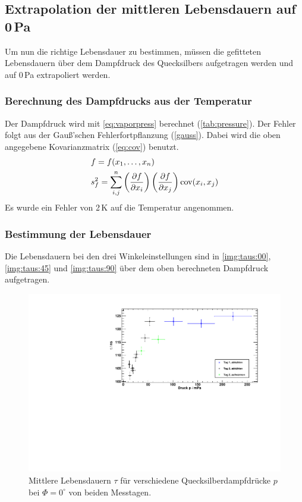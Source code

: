 \subsection{Extrapolation der mittleren Lebensdauern auf  \texorpdfstring{0\,Pa}{0 Pa}}
Um nun die richtige Lebensdauer zu bestimmen, müssen die gefitteten Lebensdauern über dem Dampfdruck des Quecksilbers aufgetragen werden und auf 
0\,Pa extrapoliert werden.
\subsubsection{Berechnung des Dampfdrucks aus der Temperatur}
Der Dampfdruck wird mit \autoref{eq:vaporpress} berechnet (\autoref{tab:pressure}). Der Fehler folgt aus der Gauß'schen Fehlerfortpflanzung (\autoref{gauss}).
Dabei wird die oben angegebene Kovarianzmatrix (\autoref{eq:cov}) benutzt.
\begin{equation}
\begin{split}
\label{gauss}
  & f = f(x_1, \ldots, x_n) \\
  & s_f^2 = \sum_{i, j}^n \left( \frac{\partial f}{\partial x_i} \right) \left( \frac{\partial f}{\partial x_j} \right) \operatorname{cov}(x_i, x_j)
\end{split}
\end{equation}
Es wurde ein Fehler von 2\,K auf die Temperatur angenommen.

\subsubsection{Bestimmung der Lebensdauer}
\label{subsub:fittaus}
Die Lebensdauern bei den drei Winkeleinstellungen sind in \autoref{img:taus:00}, \autoref{img:taus:45} und \autoref{img:taus:90} über 
dem oben berechneten Dampfdruck aufgetragen. 

\begin{figure}[H]
\begin{center}
  \includegraphics[width=\textwidth]{../img/taus_00.pdf}
  \caption{Mittlere Lebensdauern $\tau$ für verschiedene Quecksilberdampfdrücke $p$ bei $\Phi = 0^{\circ}$
  von beiden Messtagen.}
  \label{img:taus:00}
\end{center}
\end{figure}

